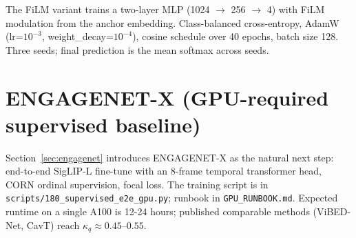 \documentclass[10pt,twocolumn,letterpaper]{article}
\begin{document}
The FiLM variant trains a two-layer MLP (1024 $\to$ 256 $\to$ 4) with FiLM
modulation from the anchor embedding. Class-balanced cross-entropy,
AdamW (lr=$10^{-3}$, weight\_decay=$10^{-4}$), cosine schedule over 40
epochs, batch size 128. Three seeds; final prediction is the mean
softmax across seeds.

\section{ENGAGENET-X (GPU-required supervised baseline)}
\label{sec:engagenet-x-supp}

Section~\ref{sec:engagenet} introduces ENGAGENET-X as the natural
next step: end-to-end SigLIP-L fine-tune with an 8-frame temporal
transformer head, CORN ordinal supervision, focal loss. The training
script is in \texttt{scripts/180\_supervised\_e2e\_gpu.py};
runbook in \texttt{GPU\_RUNBOOK.md}. Expected runtime on a single
A100 is 12-24 hours; published comparable methods (ViBED-Net,
CavT) reach $\kappa_q \approx 0.45$--$0.55$.
\end{document}

